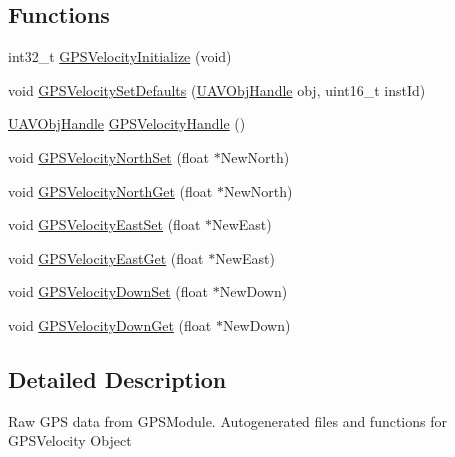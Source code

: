 \subsection*{\-Functions}
\begin{DoxyCompactItemize}
\item 
int32\-\_\-t \hyperlink{group___g_p_s_velocity_ga82dc28220c42f19c1aa0af3713a277d5}{\-G\-P\-S\-Velocity\-Initialize} (void)
\item 
void \hyperlink{group___g_p_s_velocity_ga6f7e8005f2d784eeffc919e8e59b945a}{\-G\-P\-S\-Velocity\-Set\-Defaults} (\hyperlink{targets_2_u_a_v_objects_2inc_2uavobjectmanager_8h_a279053e22be53ce9f895043aaeb91e3b}{\-U\-A\-V\-Obj\-Handle} obj, uint16\-\_\-t inst\-Id)
\item 
\hyperlink{targets_2_u_a_v_objects_2inc_2uavobjectmanager_8h_a279053e22be53ce9f895043aaeb91e3b}{\-U\-A\-V\-Obj\-Handle} \hyperlink{group___g_p_s_velocity_gab0ec9e4d0ddcea4e94ab96de90ece230}{\-G\-P\-S\-Velocity\-Handle} ()
\item 
void \hyperlink{group___g_p_s_velocity_gad7f10f808633af0e48f2f85d4598b057}{\-G\-P\-S\-Velocity\-North\-Set} (float $\ast$\-New\-North)
\item 
void \hyperlink{group___g_p_s_velocity_gab3156c0f94fedb68830db52bc9a62f10}{\-G\-P\-S\-Velocity\-North\-Get} (float $\ast$\-New\-North)
\item 
void \hyperlink{group___g_p_s_velocity_ga4d94a286e84794b067e6d56d3a90f8e7}{\-G\-P\-S\-Velocity\-East\-Set} (float $\ast$\-New\-East)
\item 
void \hyperlink{group___g_p_s_velocity_ga387530bf3122cbc0659987b51fc1689f}{\-G\-P\-S\-Velocity\-East\-Get} (float $\ast$\-New\-East)
\item 
void \hyperlink{group___g_p_s_velocity_gae492477feaad0ea10e5b960db827a736}{\-G\-P\-S\-Velocity\-Down\-Set} (float $\ast$\-New\-Down)
\item 
void \hyperlink{group___g_p_s_velocity_ga860c0bfdb478ad9056fc9ce76ffa4468}{\-G\-P\-S\-Velocity\-Down\-Get} (float $\ast$\-New\-Down)
\end{DoxyCompactItemize}


\subsection{\-Detailed \-Description}
\-Raw \-G\-P\-S data from \-G\-P\-S\-Module. \-Autogenerated files and functions for \-G\-P\-S\-Velocity \-Object 

